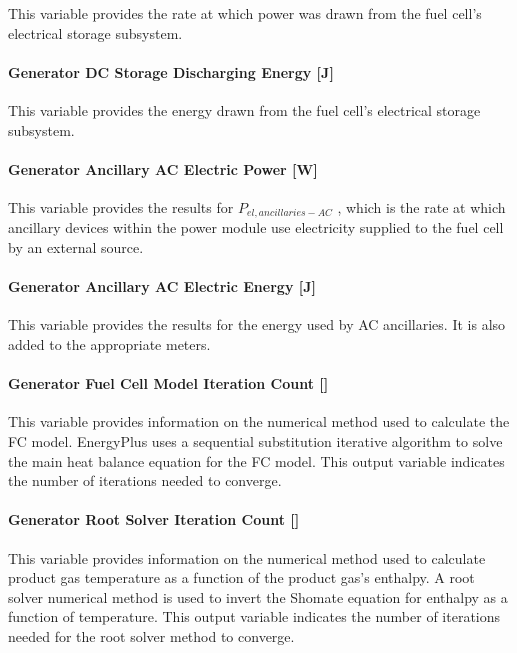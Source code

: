 This variable provides the rate at which power was drawn from the fuel cell's electrical storage subsystem.

\paragraph{Generator DC Storage Discharging Energy {[}J{]}}\label{generator-dc-storage-discharging-energy-j}

This variable provides the energy drawn from the fuel cell's electrical storage subsystem.

\paragraph{Generator Ancillary AC Electric Power {[}W{]}}\label{generator-ancillary-ac-electric-power-w}

This variable provides the results for \({P_{el,ancillaries - AC}}\) , which is the rate at which ancillary devices within the power module use electricity supplied to the fuel cell by an external source.

\paragraph{Generator Ancillary AC Electric Energy {[}J{]}}\label{generator-ancillary-ac-electric-energy-j}

This variable provides the results for the energy used by AC ancillaries. It is also added to the appropriate meters.

\paragraph{Generator Fuel Cell Model Iteration Count {[]}}\label{generator-fuel-cell-model-iteration-count}

This variable provides information on the numerical method used to calculate the FC model. EnergyPlus uses a sequential substitution iterative algorithm to solve the main heat balance equation for the FC model. This output variable indicates the number of iterations needed to converge.

\paragraph{Generator Root Solver Iteration Count {[]}}\label{generator-regula-falsi-iteration-count}

This variable provides information on the numerical method used to calculate product gas temperature as a function of the product gas's enthalpy. A root solver numerical method is used to invert the Shomate equation for enthalpy as a function of temperature. This output variable indicates the number of iterations needed for the root solver method to converge.

